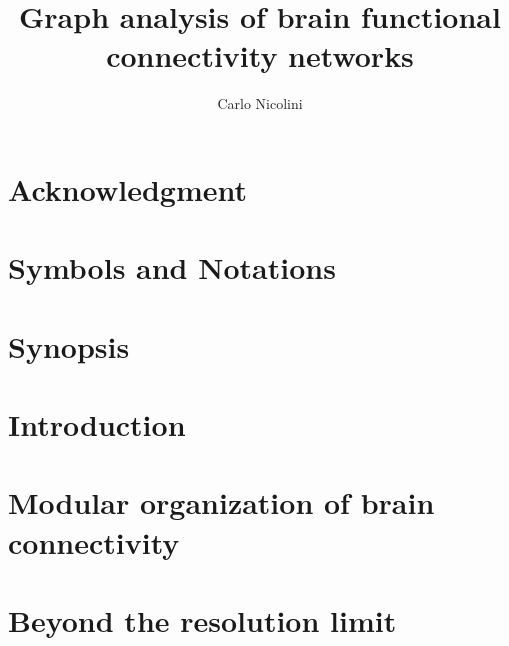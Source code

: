 
%

\title{Graph analysis of brain functional connectivity networks}
\author{Carlo Nicolini}

\newtheorem{obs}{Observation}
\newtheorem{props}{Proposition}



\maketitle
{}

\tableofcontents
\listoftodos

\chapter*{Acknowledgment}


\chapter*{Symbols and Notations}


\chapter*{Synopsis}\label{chap:synopsis}



\chapter{Introduction}\label{chap:introduction}
	

\chapter{Modular organization of brain connectivity}\label{chap:modularorganization}
	

\chapter{Beyond the resolution limit}\label{chap:beyondresolutionlimit}
	

